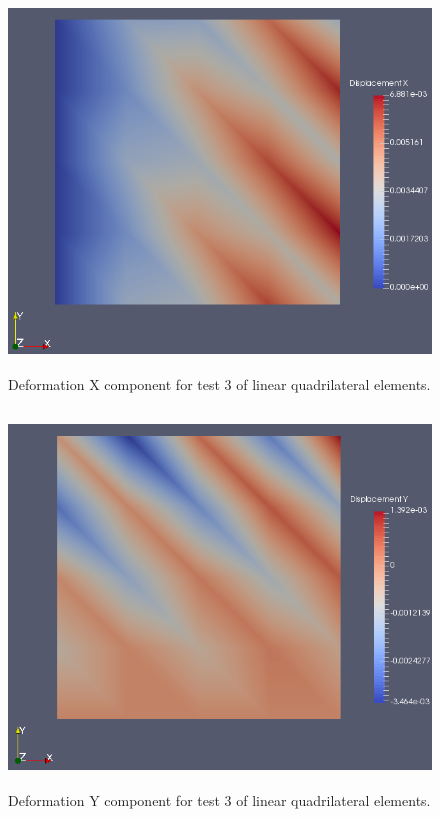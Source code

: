\documentclass[a4paper, 12pt]{article}
\begin{document}
\begin{figure}[H]
  \centering
  \includegraphics[width=13cm, height=10cm]{quad_4_t3_disp_X}
  \caption{Deformation X component for test 3 of linear 
            quadrilateral elements.}
  \label{fig:linQuad3_x}
\end{figure}

\begin{figure}[H]
  \centering
  \includegraphics[width=13cm, height=10cm]{quad_4_t3_disp_Y}
  \caption{Deformation Y component for test 3 of linear 
            quadrilateral elements.}
  \label{fig:linQuad3_y}
\end{figure}
\end{document}
